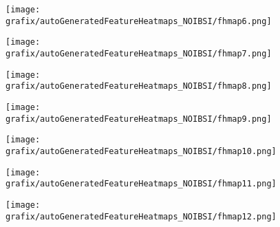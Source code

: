 \hspace{\hsp} 
\begin{subfigure}{\wid\textwidth} 
    \centering 
    \caption{\tiny \sffamily {}} 
    \vspace{\vsp} 
    \texttt{[image: grafix/autoGeneratedFeatureHeatmaps\_NOIBSI/fhmap6.png]} 
\end{subfigure} 
\hspace{\hsp} 
\begin{subfigure}{\wid\textwidth} 
    \centering 
    \caption{\tiny \sffamily {}} 
    \vspace{\vsp} 
    \texttt{[image: grafix/autoGeneratedFeatureHeatmaps\_NOIBSI/fhmap7.png]} 
\end{subfigure} 
\hspace{\hsp} 
\begin{subfigure}{\wid\textwidth} 
    \centering 
    \caption{\tiny \sffamily {}} 
    \vspace{\vsp} 
    \texttt{[image: grafix/autoGeneratedFeatureHeatmaps\_NOIBSI/fhmap8.png]} 
\end{subfigure} 
\hspace{\hsp} 
\begin{subfigure}{\wid\textwidth} 
    \centering 
    \caption{\tiny \sffamily {}} 
    \vspace{\vsp} 
    \texttt{[image: grafix/autoGeneratedFeatureHeatmaps\_NOIBSI/fhmap9.png]} 
\end{subfigure} 
\hspace{\hsp} 
\begin{subfigure}{\wid\textwidth} 
    \centering 
    \caption{\tiny \sffamily {}} 
    \vspace{\vsp} 
    \texttt{[image: grafix/autoGeneratedFeatureHeatmaps\_NOIBSI/fhmap10.png]} 
\end{subfigure} 
\hspace{\hsp} 
\begin{subfigure}{\wid\textwidth} 
    \centering 
    \caption{\tiny \sffamily {}} 
    \vspace{\vsp} 
    \texttt{[image: grafix/autoGeneratedFeatureHeatmaps\_NOIBSI/fhmap11.png]} 
\end{subfigure} 
\hspace{\hsp} 
\begin{subfigure}{\wid\textwidth} 
    \centering 
    \caption{\tiny \sffamily {}} 
    \vspace{\vsp} 
    \texttt{[image: grafix/autoGeneratedFeatureHeatmaps\_NOIBSI/fhmap12.png]} 
\end{subfigure} 
